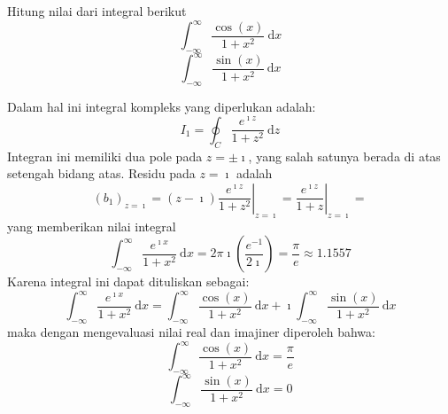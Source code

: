 Hitung nilai dari integral berikut
\[
\int_{-\infty}^{\infty}\frac{\cos(x)}{1+x^{2}}\ \mathrm{d}x
\]
\[
\int_{-\infty}^{\infty}\frac{\sin(x)}{1+x^{2}}\ \mathrm{d}x
\]

Dalam hal ini integral kompleks yang diperlukan adalah:
\[
I_{1}=\oint_{C}\frac{e^{\imath z}}{1+z^{2}}\ \mathrm{d}z
\]
Integran ini memiliki dua pole pada $z=\pm\imath$, yang salah satunya
berada di atas setengah bidang atas. Residu pada $z=\imath$ adalah
\[
\left(b_{1}\right)_{z=\imath}=\left.(z-\imath)\frac{e^{\imath z}}{1+z^{2}}\right|_{z=\imath}=\left.\frac{e^{\imath z}}{1+z}\right|_{z=\imath}=
\]
yang memberikan nilai integral
\[
\int_{-\infty}^{\infty}\frac{e^{\imath x}}{1+x^{2}}\ \mathrm{d}x=2\pi\imath\left(\frac{e^{-1}}{2\imath}\right)=\frac{\pi}{e}\approx1.1557
\]
Karena integral ini dapat dituliskan sebagai:
\[
\int_{-\infty}^{\infty}\frac{e^{\imath x}}{1+x^{2}}\ \mathrm{d}x=\int_{-\infty}^{\infty}\frac{\cos(x)}{1+x^{2}}\ \mathrm{d}x+\imath\int_{-\infty}^{\infty}\frac{\sin(x)}{1+x^{2}}\ \mathrm{d}x
\]
maka dengan mengevaluasi nilai real dan imajiner diperoleh bahwa:
\[
\int_{-\infty}^{\infty}\frac{\cos(x)}{1+x^{2}}\ \mathrm{d}x=\frac{\pi}{e}
\]
\[
\int_{-\infty}^{\infty}\frac{\sin(x)}{1+x^{2}}\ \mathrm{d}x=0
\]






